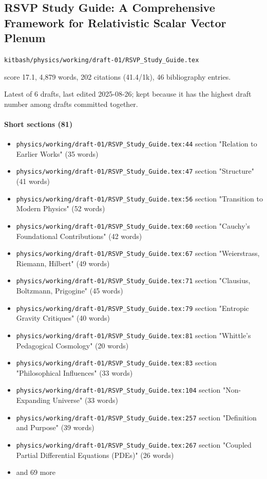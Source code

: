 \documentclass[11pt]{article}
\newcommand{\loc}[1]{{\small\color{muted}\texttt{#1}}}
\begin{document}
\subsection{RSVP Study Guide: A Comprehensive Framework for Relativistic Scalar Vector Plenum}
\loc{kitbash/\allowbreak{}physics/\allowbreak{}working/\allowbreak{}draft-01/\allowbreak{}RSVP\_Study\_Guide.tex}\par
score 17.1, 4,879 words, 202 citations (41.4/1k), 46 bibliography entries.

Latest of 6 drafts, last edited 2025-08-26; kept because it has the highest draft number among drafts committed together.

\paragraph{Short sections (81)}
\begin{itemize}
\item \loc{physics/\allowbreak{}working/\allowbreak{}draft-01/\allowbreak{}RSVP\_Study\_Guide.tex:44} section "Relation to Earlier Works" (35 words)
\item \loc{physics/\allowbreak{}working/\allowbreak{}draft-01/\allowbreak{}RSVP\_Study\_Guide.tex:47} section "Structure" (41 words)
\item \loc{physics/\allowbreak{}working/\allowbreak{}draft-01/\allowbreak{}RSVP\_Study\_Guide.tex:56} section "Transition to Modern Physics" (52 words)
\item \loc{physics/\allowbreak{}working/\allowbreak{}draft-01/\allowbreak{}RSVP\_Study\_Guide.tex:60} section "Cauchy's Foundational Contributions" (42 words)
\item \loc{physics/\allowbreak{}working/\allowbreak{}draft-01/\allowbreak{}RSVP\_Study\_Guide.tex:67} section "Weierstrass, Riemann, Hilbert" (49 words)
\item \loc{physics/\allowbreak{}working/\allowbreak{}draft-01/\allowbreak{}RSVP\_Study\_Guide.tex:71} section "Clausius, Boltzmann, Prigogine" (45 words)
\item \loc{physics/\allowbreak{}working/\allowbreak{}draft-01/\allowbreak{}RSVP\_Study\_Guide.tex:79} section "Entropic Gravity Critiques" (40 words)
\item \loc{physics/\allowbreak{}working/\allowbreak{}draft-01/\allowbreak{}RSVP\_Study\_Guide.tex:81} section "Whittle's Pedagogical Cosmology" (20 words)
\item \loc{physics/\allowbreak{}working/\allowbreak{}draft-01/\allowbreak{}RSVP\_Study\_Guide.tex:83} section "Philosophical Influences" (33 words)
\item \loc{physics/\allowbreak{}working/\allowbreak{}draft-01/\allowbreak{}RSVP\_Study\_Guide.tex:104} section "Non-Expanding Universe" (33 words)
\item \loc{physics/\allowbreak{}working/\allowbreak{}draft-01/\allowbreak{}RSVP\_Study\_Guide.tex:257} section "Definition and Purpose" (39 words)
\item \loc{physics/\allowbreak{}working/\allowbreak{}draft-01/\allowbreak{}RSVP\_Study\_Guide.tex:267} section "Coupled Partial Differential Equations (PDEs)" (26 words)
\item[] {\color{muted}\small and 69 more}
\end{itemize}
\end{document}

